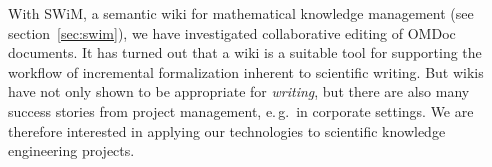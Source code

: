 With SWiM, a semantic wiki for mathematical knowledge management (see
section~\ref{sec:swim}), we have investigated collaborative editing of OMDoc
documents.  It has turned out that a wiki is a suitable tool for supporting the
workflow of incremental formalization inherent to scientific writing.  But wikis
have not only shown to be appropriate for \emph{writing}, but there are also
many success stories from project management, e.\,g.\ in corporate
settings\cite{leuf01:wikiway,wikinomics}.  We are therefore interested in applying
our technologies to scientific knowledge engineering projects.

